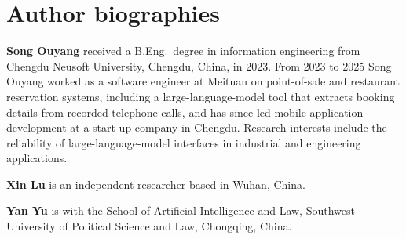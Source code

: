 \section*{Author biographies}
\noindent\textbf{Song Ouyang} received a B.Eng.\ degree in information engineering from Chengdu Neusoft University, Chengdu, China, in 2023. From 2023 to 2025 Song Ouyang worked as a software engineer at Meituan on point-of-sale and restaurant reservation systems, including a large-language-model tool that extracts booking details from recorded telephone calls, and has since led mobile application development at a start-up company in Chengdu. Research interests include the reliability of large-language-model interfaces in industrial and engineering applications.

\medskip
\noindent\textbf{Xin Lu} is an independent researcher based in Wuhan, China.

\medskip
\noindent\textbf{Yan Yu} is with the School of Artificial Intelligence and Law, Southwest University of Political Science and Law, Chongqing, China.
